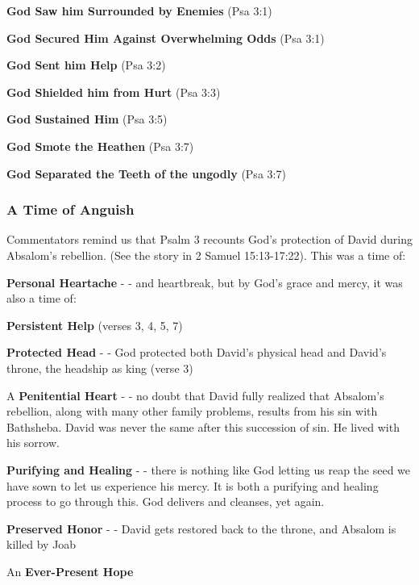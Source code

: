 \begin{compactenum}[I.]
    \item \textbf{God Saw him Surrounded by Enemies}  (Psa 3:1)
    \item \textbf{God Secured Him Against Overwhelming Odds}  (Psa 3:1)
    \item \textbf{God Sent him Help}  (Psa 3:2)
    \item \textbf{God Shielded him from Hurt}  (Psa 3:3)
    \item \textbf{God Sustained Him}  (Psa 3:5)
    \item \textbf{God Smote the Heathen}  (Psa 3:7)
    \item \textbf{God Separated the Teeth of the ungodly}  (Psa 3:7)
\end{compactenum}

\subsubsection{A Time of Anguish}
Commentators remind us that Psalm 3 recounts God's protection of David during Absalom's rebellion. (See the story in 2 Samuel 15:13-17:22). This was a time of: 

\begin{compactenum}[I.]
    \item \textbf{Personal Heartache} - - and heartbreak, but by God's grace and mercy, it was also a time of:
    \item \textbf{Persistent Help} (verses 3, 4, 5, 7)
    \item \textbf{Protected Head} - - God protected both David's physical head and David's throne, the headship as king (verse 3)
    \item A \textbf{Penitential Heart} - - no doubt that David fully realized that Absalom's rebellion, along with many other family problems, results from his sin with Bathsheba. David was never the same after this succession of sin.  He lived with his sorrow.
    \item \textbf{Purifying and Healing} - - there is nothing like God letting us reap the seed we have sown to let us experience his mercy. It is both a purifying and healing process to go through this.  God delivers and cleanses, yet again. 
    \item \textbf{Preserved Honor} - - David gets restored back to the throne, and Absalom is killed by Joab
    \item An \textbf{Ever-Present Hope}
\end{compactenum}


